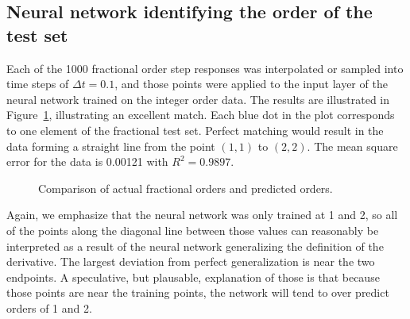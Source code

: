 \subsection{Neural network identifying the order of the test set}

Each of the 1000 fractional order step responses was interpolated or sampled
into time steps of $\Delta t = 0.1$, and those points were applied to the input
layer of the neural network trained on the integer order data. The results are
illustrated in Figure~\ref{fig:accuracy}, illustrating an excellent match. Each
blue dot in the plot corresponds to one element of the fractional test set.
Perfect matching would result in the data forming a straight line from the point
$(1,1)$ to $(2,2)$. The mean square error for the data is 0.00121 with $R^2 =
0.9897$.

\begin{figure}
\centering

\vspace*{-5pt}
\caption{Comparison of actual fractional orders and predicted orders.}
\label{fig:accuracy}
\end{figure}

Again, we emphasize that the neural network was only trained at 1 and 2, so all
of the points along the diagonal line between those values can reasonably be
interpreted as a result of the neural network generalizing the definition of the
derivative. The largest deviation from perfect generalization is near the two
endpoints. A speculative, but plausable, explanation of those is that because
those points are near the training points, the network will tend to over predict
orders of 1 and 2.

